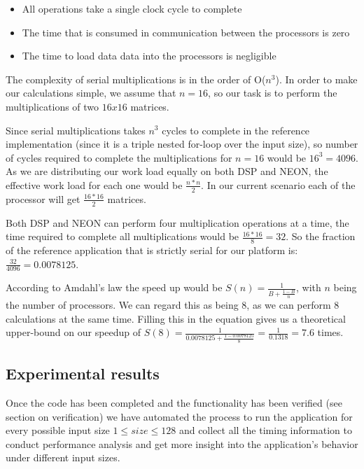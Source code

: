 \begin{itemize}
\item All operations take a single clock cycle to complete
\item The time that is consumed in communication between the processors is zero
\item The time to load data data into the processors is negligible
\end{itemize}

The complexity of serial multiplications is in the order of O($n^3$). In order to make our calculations simple, we assume that $n = 16$, so our task is to perform the multiplications of two $16x16$ matrices.

Since serial multiplications takes $n^3$ cycles to complete in the reference implementation (since it is a triple nested for-loop over the input size), so number of cycles required to complete the multiplications for $n = 16$ would be $16^3 = 4096$. As we are distributing our work load equally on both DSP and NEON, the effective work load for each one would be $\frac{n * n}{2}$. In our current scenario each of the processor will get $\frac{16 * 16}{2}$ matrices.

Both DSP and NEON can perform four multiplication operations at a time, the time required to complete all multiplications would be $\frac{16*16}{8} = 32$. So the fraction of the reference application that is strictly serial for our platform is: $\frac{32}{4096} = 0.0078125$.

According to Amdahl's law the speed up would be $S(n) = \frac{1}{B + \frac{1 - B}{n}}$, with $n$ being the number of processors. We can regard this as being 8, as we can perform 8 calculations at the same time. Filling this in the equation gives us a theoretical upper-bound on our speedup of $S(8) = \frac{1}{{0.0078125 + \frac{1 - 0.0078125}{8}}} = \frac{1}{0.1318} = 7.6$ times.

\subsection{Experimental results}

Once the code has been completed and the functionality has been verified (see section on verification) we have automated the process to run the application for every possible input size $1 \leq size \leq 128$ and collect all the timing information to conduct performance analysis and get more insight into the application's behavior under different input sizes.

